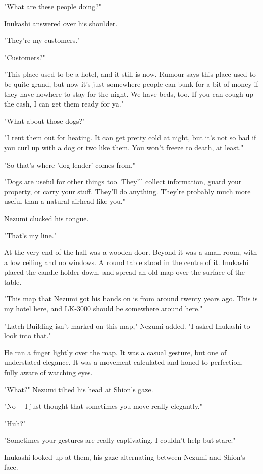"What are these people doing?"

Inukashi answered over his shoulder.

"They're my customers."

"Customers?"

"This place used to be a hotel, and it still is now. Rumour says this
place used to be quite grand, but now it's just somewhere people can
bunk for a bit of money if they have nowhere to stay for the night. We
have beds, too. If you can cough up the cash, I can get them ready for
ya."

"What about those dogs?"

"I rent them out for heating. It can get pretty cold at night, but it's
not so bad if you curl up with a dog or two like them. You won't freeze
to death, at least."

"So that's where 'dog-lender' comes from."

"Dogs are useful for other things too. They'll collect information,
guard your property, or carry your stuff. They'll do anything. They're
probably much more useful than a natural airhead like you."

Nezumi clucked his tongue.

"That's my line."

At the very end of the hall was a wooden door. Beyond it was a small
room, with a low ceiling and no windows. A round table stood in the
centre of it. Inukashi placed the candle holder down, and spread an old
map over the surface of the table.

"This map that Nezumi got his hands on is from around twenty years ago.
This is my hotel here, and LK-3000 should be somewhere around here."

"Latch Building isn't marked on this map," Nezumi added. "I asked
Inukashi to look into that."

He ran a finger lightly over the map. It was a casual gesture, but one
of understated elegance. It was a movement calculated and honed to
perfection, fully aware of watching eyes.

"What?" Nezumi tilted his head at Shion's gaze.

"No--- I just thought that sometimes you move really elegantly."

"Huh?"

"Sometimes your gestures are really captivating. I couldn't help but
stare."

Inukashi looked up at them, his gaze alternating between Nezumi and
Shion's face.

